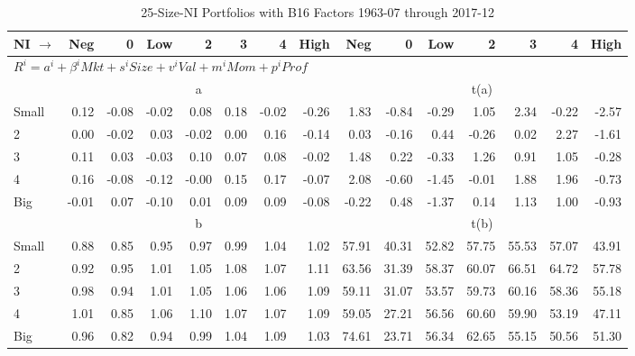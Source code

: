 
\begin{table}[!ht]
\scriptsize
\centering
\caption{25-Size-NI Portfolios with B16 Factors 1963-07 through 2017-12}
\begin{tabular}{lrrrrrrrrrrrrrr}
  \toprule
    
    NI $\rightarrow$ & Neg & 0 & Low & 2 & 3 & 4 & High & Neg & 0 & Low & 2 & 3 & 4 & High  \\ 
  \midrule
  \multicolumn{15}{l}{$R^i=a^i+\beta^iMkt+s^iSize+v^iVal+m^iMom+p^iProf$}  \\
  
     & \multicolumn{7}{c}{a} & \multicolumn{7}{c}{t(a)}   \\
     \cmidrule(r){2-8} \cmidrule(r){9-15} 
    Small  & 0.12  & -0.08  & -0.02  & 0.08  & 0.18  & -0.02  & -0.26  & 1.83  & -0.84  & -0.29  & 1.05  & 2.34  & -0.22  & -2.57   \\
    2  & 0.00  & -0.02  & 0.03  & -0.02  & 0.00  & 0.16  & -0.14  & 0.03  & -0.16  & 0.44  & -0.26  & 0.02  & 2.27  & -1.61   \\
    3  & 0.11  & 0.03  & -0.03  & 0.10  & 0.07  & 0.08  & -0.02  & 1.48  & 0.22  & -0.33  & 1.26  & 0.91  & 1.05  & -0.28   \\
    4  & 0.16  & -0.08  & -0.12  & -0.00  & 0.15  & 0.17  & -0.07  & 2.08  & -0.60  & -1.45  & -0.01  & 1.88  & 1.96  & -0.73   \\
    Big  & -0.01  & 0.07  & -0.10  & 0.01  & 0.09  & 0.09  & -0.08  & -0.22  & 0.48  & -1.37  & 0.14  & 1.13  & 1.00  & -0.93   \\
    
  
     & \multicolumn{7}{c}{b} & \multicolumn{7}{c}{t(b)}   \\
     \cmidrule(r){2-8} \cmidrule(r){9-15} 
    Small  & 0.88  & 0.85  & 0.95  & 0.97  & 0.99  & 1.04  & 1.02  & 57.91  & 40.31  & 52.82  & 57.75  & 55.53  & 57.07  & 43.91   \\
    2  & 0.92  & 0.95  & 1.01  & 1.05  & 1.08  & 1.07  & 1.11  & 63.56  & 31.39  & 58.37  & 60.07  & 66.51  & 64.72  & 57.78   \\
    3  & 0.98  & 0.94  & 1.01  & 1.05  & 1.06  & 1.06  & 1.09  & 59.11  & 31.07  & 53.57  & 59.73  & 60.16  & 58.36  & 55.18   \\
    4  & 1.01  & 0.85  & 1.06  & 1.10  & 1.07  & 1.07  & 1.09  & 59.05  & 27.21  & 56.56  & 60.60  & 59.90  & 53.19  & 47.11   \\
    Big  & 0.96  & 0.82  & 0.94  & 0.99  & 1.04  & 1.09  & 1.03  & 74.61  & 23.71  & 56.34  & 62.65  & 55.15  & 50.56  & 51.30   \\
    

\end{tabular}
\end{table}
